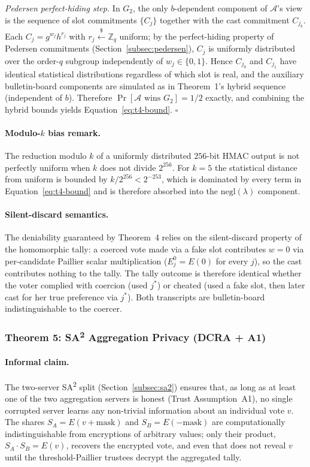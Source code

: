 \emph{Pedersen perfect-hiding step.} In $G_2$, the only $b$-dependent component of $\mathcal{A}$'s view is the sequence of slot commitments $\{C_j\}$ together with the cast commitment $C_{j_b}$. Each $C_j = g^{w_j} h^{r_j}$ with $r_j \stackrel{\$}{\leftarrow} \mathbb{Z}_q$ uniform; by the perfect-hiding property of Pedersen commitments (Section~\ref{subsec:pedersen}), $C_j$ is uniformly distributed over the order-$q$ subgroup independently of $w_j \in \{0, 1\}$. Hence $C_{j_0}$ and $C_{j_1}$ have identical statistical distributions regardless of which slot is real, and the auxiliary bulletin-board components are simulated as in Theorem~1's hybrid sequence (independent of $b$). Therefore $\Pr[\mathcal{A} \text{ wins } G_2] = 1/2$ exactly, and combining the hybrid bounds yields Equation~\eqref{eq:t4-bound}. \hfill $\square$

\paragraph{Modulo-$k$ bias remark.} The reduction modulo $k$ of a uniformly distributed $256$-bit HMAC output is not perfectly uniform when $k$ does not divide $2^{256}$. For $k = 5$ the statistical distance from uniform is bounded by $k / 2^{256} < 2^{-253}$, which is dominated by every term in Equation~\eqref{eq:t4-bound} and is therefore absorbed into the $\mathrm{negl}(\lambda)$ component.

\paragraph{Silent-discard semantics.} The deniability guaranteed by Theorem~4 relies on the silent-discard property of the homomorphic tally: a coerced vote made via a fake slot contributes $w = 0$ via per-candidate Paillier scalar multiplication ($E_j^{0} = E(0)$ for every $j$), so the cast contributes nothing to the tally. The tally outcome is therefore identical whether the voter complied with coercion (used $j^*$) or cheated (used a fake slot, then later cast for her true preference via $j^*$). Both transcripts are bulletin-board indistinguishable to the coercer.

\subsubsection{Theorem 5: SA\textsuperscript{2} Aggregation Privacy (DCRA + A1)}
\label{subsubsec:t5-aggregation-privacy}

\paragraph{Informal claim.} The two-server SA\textsuperscript{2} split (Section~\ref{subsec:sa2}) ensures that, as long as at least one of the two aggregation servers is honest (Trust Assumption~A1), no single corrupted server learns any non-trivial information about an individual vote $v$. The shares $S_A = E(v + \text{mask})$ and $S_B = E(-\text{mask})$ are computationally indistinguishable from encryptions of arbitrary values; only their product, $S_A \cdot S_B = E(v)$, recovers the encrypted vote, and even that does not reveal $v$ until the threshold-Paillier trustees decrypt the aggregated tally.

